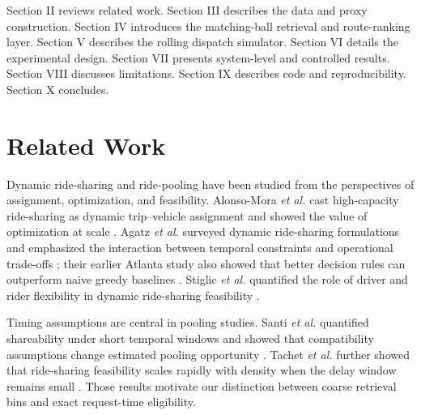 \documentclass[journal]{IEEEtran}
\begin{document}
Section II reviews related work. Section III describes the data and proxy construction. Section IV introduces the matching-ball retrieval and route-ranking layer. Section V describes the rolling dispatch simulator. Section VI details the experimental design. Section VII presents system-level and controlled results. Section VIII discusses limitations. Section IX describes code and reproducibility. Section X concludes.

\section{Related Work}
Dynamic ride-sharing and ride-pooling have been studied from the perspectives of assignment, optimization, and feasibility. Alonso-Mora \emph{et al.} cast high-capacity ride-sharing as dynamic trip--vehicle assignment and showed the value of optimization at scale \cite{alonso2017}. Agatz \emph{et al.} surveyed dynamic ride-sharing formulations and emphasized the interaction between temporal constraints and operational trade-offs \cite{agatz2012}; their earlier Atlanta study also showed that better decision rules can outperform naive greedy baselines \cite{agatz2011}. Stiglic \emph{et al.} quantified the role of driver and rider flexibility in dynamic ride-sharing feasibility \cite{stiglic2016}.

Timing assumptions are central in pooling studies. Santi \emph{et al.} quantified shareability under short temporal windows and showed that compatibility assumptions change estimated pooling opportunity \cite{santi2014}. Tachet \emph{et al.} further showed that ride-sharing feasibility scales rapidly with density when the delay window remains small \cite{tachet2017}. Those results motivate our distinction between coarse retrieval bins and exact request-time eligibility.
\end{document}
